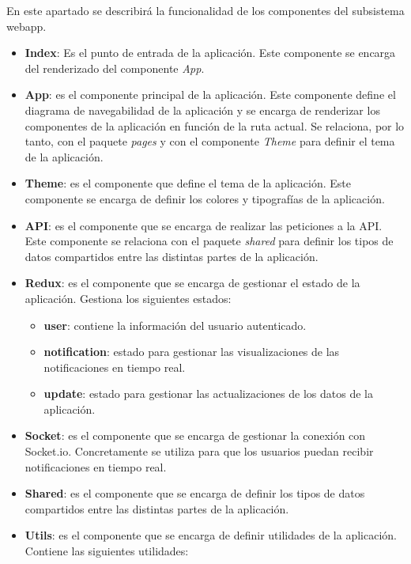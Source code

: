 En este apartado se describirá la funcionalidad de los componentes del subsistema webapp. 
\begin{itemize}
    \item \textbf{Index}: Es el punto de entrada de la aplicación. Este componente se encarga del renderizado del componente \textit{App}.
    \item \textbf{App}: es el componente principal de la aplicación. Este componente define el diagrama de navegabilidad de la aplicación y se encarga de renderizar los componentes de la aplicación en función de la ruta actual. 
    Se relaciona, por lo tanto, con el paquete \textit{pages} y con el componente \textit{Theme} para definir el tema de la aplicación.
    \item \textbf{Theme}: es el componente que define el tema de la aplicación. Este componente se encarga de definir los colores y tipografías de la aplicación.
    \item \textbf{API}: es el componente que se encarga de realizar las peticiones a la API. Este componente se relaciona con el paquete \textit{shared} para definir los tipos de datos compartidos entre las distintas partes de la aplicación.
    \item \textbf{Redux}: es el componente que se encarga de gestionar el estado de la aplicación. Gestiona los siguientes estados:
    \begin{itemize}
        \item \textbf{user}: contiene la información del usuario autenticado.
        \item \textbf{notification}: estado para gestionar las visualizaciones de las notificaciones en tiempo real.
        \item \textbf{update}: estado para gestionar las actualizaciones de los datos de la aplicación.
    \end{itemize}
    \item \textbf{Socket}: es el componente que se encarga de gestionar la conexión con Socket.io. Concretamente se utiliza para que los usuarios puedan recibir notificaciones en tiempo real.
    \item \textbf{Shared}: es el componente que se encarga de definir los tipos de datos compartidos entre las distintas partes de la aplicación.
    \item \textbf{Utils}: es el componente que se encarga de definir utilidades de la aplicación. Contiene las siguientes utilidades:
    \begin{itemize}

\end{itemize}
\end{itemize}
